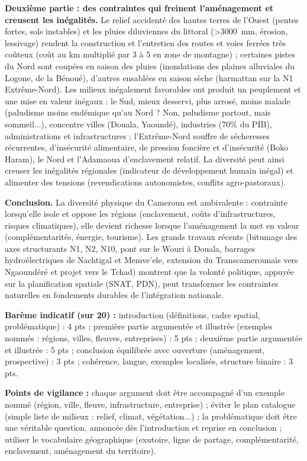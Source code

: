 \documentclass[11pt]{article}
\begin{document}
\begin{corrige}
\textbf{Deuxième partie : des contraintes qui freinent l'aménagement et creusent les inégalités.}
Le relief accidenté des hautes terres de l'Ouest (pentes fortes, sols instables) et les pluies diluviennes du littoral (\SI{>3000}{mm}, érosion, lessivage) rendent la construction et l'entretien des routes et voies ferrées très coûteux (coût au km multiplié par 3 à 5 en zone de montagne) ; certaines pistes du Nord sont coupées en saison des pluies (inondations des plaines alluviales du Logone, de la Bénoué), d'autres ensablées en saison sèche (harmattan sur la N1 Extrême-Nord). Les milieux inégalement favorables ont produit un peuplement et une mise en valeur inégaux : le Sud, mieux desservi, plus arrosé, moins malade (paludisme moins endémique qu'au Nord ? Non, paludisme partout, mais sommeil...), concentre villes (Douala, Yaoundé), industries (70\% du PIB), administrations et infrastructures ; l'Extrême-Nord souffre de sécheresses récurrentes, d'insécurité alimentaire, de pression foncière et d'insécurité (Boko Haram), le Nord et l'Adamaoua d'enclavement relatif. La diversité peut ainsi creuser les inégalités régionales (indicateur de développement humain inégal) et alimenter des tensions (revendications autonomistes, conflits agro-pastoraux).

\textbf{Conclusion.} La diversité physique du Cameroun est ambivalente : contrainte lorsqu'elle isole et oppose les régions (enclavement, coûts d'infrastructures, risques climatiques), elle devient richesse lorsque l'aménagement la met en valeur (complémentarités, énergie, tourisme). Les grands travaux récents (bitumage des axes structurants N1, N2, N10, pont sur le Wouri à Douala, barrages hydroélectriques de Nachtigal et Memve'ele, extension du Transcamerounais vers Ngaoundéré et projet vers le Tchad) montrent que la volonté politique, appuyée sur la planification spatiale (SNAT, PDN), peut transformer les contraintes naturelles en fondements durables de l'intégration nationale.

\textbf{Barème indicatif (sur 20) :} introduction (définitions, cadre spatial, problématique) : 4 pts ; première partie argumentée et illustrée (exemples nommés : régions, villes, fleuves, entreprises) : 5 pts ; deuxième partie argumentée et illustrée : 5 pts ; conclusion équilibrée avec ouverture (aménagement, prospective) : 3 pts ; cohérence, langue, exemples localisés, structure binaire : 3 pts.

\textbf{Points de vigilance :} chaque argument doit être accompagné d'un exemple nommé (région, ville, fleuve, infrastructure, entreprise) ; éviter le plan catalogue (simple liste de milieux : relief, climat, végétation...) ; la problématique doit être une véritable question, annoncée dès l'introduction et reprise en conclusion ; utiliser le vocabulaire géographique (exutoire, ligne de partage, complémentarité, enclavement, aménagement du territoire).
\end{corrige}
\end{document}

